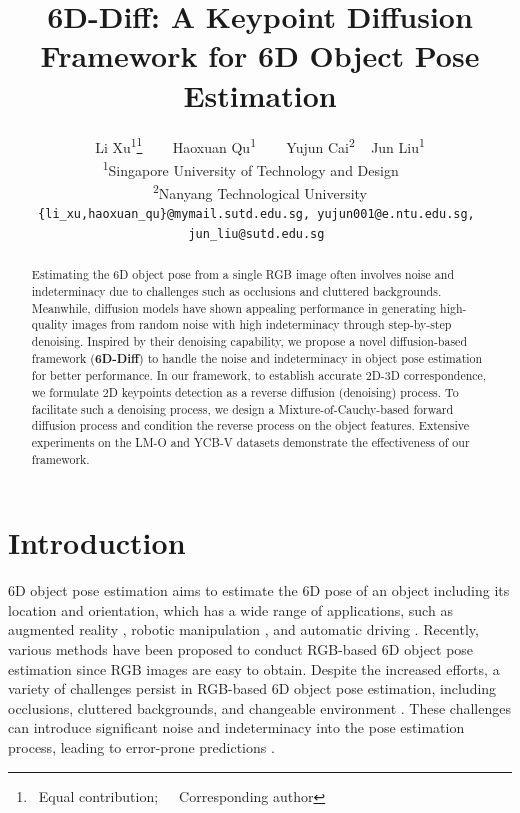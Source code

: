 \documentclass[10pt,twocolumn,letterpaper]{article}
\title{6D-Diff: A Keypoint Diffusion Framework for 6D Object Pose Estimation}
\author{Li Xu\textsuperscript{1\dag}\thanks{ \dag~Equal contribution;~~\ddag~Corresponding author}
~~~ Haoxuan Qu\textsuperscript{1\dag}
~~~ Yujun Cai\textsuperscript{2}
~ Jun Liu\textsuperscript{1\ddag} \\
\textsuperscript{1}Singapore University of Technology and Design ~~ \\
\textsuperscript{2}Nanyang Technological University \\
{\tt\small \{li\_xu,haoxuan\_qu\}@mymail.sutd.edu.sg, yujun001@e.ntu.edu.sg, }\\ 
{\tt\small  jun\_liu@sutd.edu.sg } \\
}
\begin{document}
\maketitle

\begin{abstract}
Estimating the 6D object pose from a single RGB image often involves noise and indeterminacy due to challenges such as occlusions and cluttered backgrounds. 
Meanwhile, diffusion models have shown appealing performance in generating high-quality images from random noise with high indeterminacy through step-by-step denoising. 
Inspired by their denoising capability, we propose a novel diffusion-based framework (\textbf{6D-Diff}) to handle the noise and indeterminacy in object pose estimation for better performance. 
In our framework, to establish accurate 2D-3D correspondence, we formulate 2D keypoints detection as a reverse diffusion (denoising) process.
To facilitate such a denoising process, we design a Mixture-of-Cauchy-based forward diffusion process and condition the reverse process on the object features.
Extensive experiments on the LM-O and YCB-V datasets demonstrate the effectiveness of our framework.
\end{abstract}

\section{Introduction}
6D object pose estimation aims to estimate the 6D pose of an object including its location and orientation, 
which has a wide range of applications, such as augmented reality \cite{marchand2015pose,Rambach20186DoFOT}, robotic manipulation 
\cite{perez2016robot,busam2015stereo}, and automatic driving \cite{wu20196d}. 
Recently, various methods \cite{peng2019pvnet,xu2022rnnpose,su2022zebrapose,castro2023crt,kehl2017ssd,hu2020single,wang2021gdr,chen2020end,hodan2020epos} have been proposed to conduct RGB-based 6D object pose estimation since RGB images are easy to obtain.
Despite the increased efforts, a variety of challenges persist in RGB-based 6D object pose estimation, including occlusions, cluttered backgrounds, and changeable environment \cite{xiang2018posecnn,peng2019pvnet, di2021so, wang2021occlusion, mei2022spatial}. 
These challenges can introduce significant noise and indeterminacy into the pose estimation process, leading to error-prone predictions \cite{peng2019pvnet, di2021so, mei2022spatial}.
\end{document}
